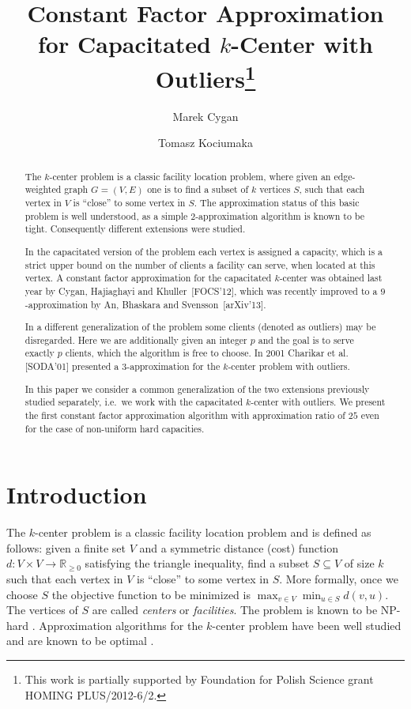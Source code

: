 \documentclass{article}
\title{Constant Factor Approximation\\ for Capacitated $k$-Center with
Outliers\footnote{This work is partially supported by Foundation for Polish Science grant HOMING PLUS/2012-6/2.} }
\author{Marek Cygan}
\author{Tomasz Kociumaka}
\affil{Institute of Informatics, University of Warsaw, Poland\\
  \texttt{[cygan, kociumaka]@mimuw.edu.pl}}
\date{}
\newcommand{\preal}{\mathbb{R}_{\ge 0}}
\theoremstyle{plain}
\theoremstyle{definition}
\begin{document}
\maketitle

\begin{abstract}
The $k$-center problem is a classic facility location problem,
where given an edge-weighted graph $G = (V,E)$ one is to find a subset 
of $k$ vertices $S$, such that each vertex in $V$ is ``close''
to some vertex in $S$. 
The approximation status of this basic problem is well understood,
as a simple $2$-approximation algorithm is 
known to be tight. 
Consequently different extensions were studied.

In the capacitated version of the problem each vertex is assigned
a capacity, which is a strict upper bound on the number of clients
a facility can serve, when located at this vertex.
A constant factor approximation for the capacitated $k$-center was obtained
last year by Cygan, Hajiaghayi and Khuller~[FOCS'12], which
was recently improved to a $9$-approximation
by An, Bhaskara and Svensson~[arXiv'13].

In a different generalization of the problem some
clients (denoted as outliers) may be disregarded.
Here we are additionally given an integer $p$ and the 
goal is to serve exactly $p$ clients, which the algorithm
is free to choose.
In 2001 Charikar et al. [SODA'01] presented a $3$-approximation
for the $k$-center problem with outliers.

In this paper we consider a common generalization of the two
extensions previously studied separately, i.e.\ we work
with the capacitated $k$-center with outliers. We present the first constant factor approximation algorithm
with approximation ratio of $25$ even for the case of non-uniform hard capacities.
\end{abstract}

\section{Introduction}

The $k$-center problem is a classic facility location problem and
is defined as follows: given a finite set $V$ and a symmetric distance (cost)
function $d: V\times V \to \preal$ satisfying the triangle inequality,
find a subset $S \subseteq V$ of size $k$ such that each vertex
in $V$ is ``close'' to some vertex in $S$. More formally, once we choose $S$ 
the objective function to be minimized is $ \max_{v \in V} \min_{u \in S}
d(v,u)$.
The vertices of $S$ are called \emph{centers} or \emph{facilities}.
The problem is known to be NP-hard \cite{GJ}.  Approximation algorithms for the 
$k$-center problem have been well studied and are known to be optimal \cite{Gonzalez,HS1,HS2,HN}. 
\end{document}
